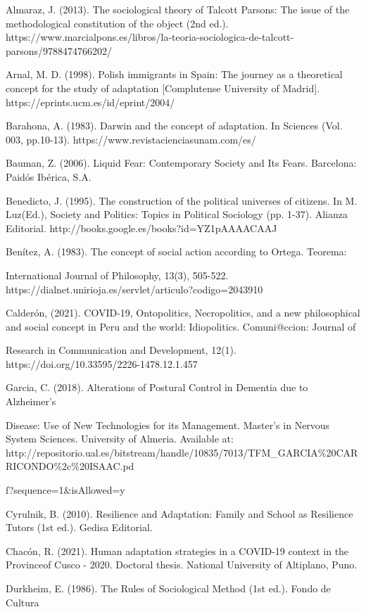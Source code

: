\documentclass{article}
\begin{document}
Almaraz, J. (2013). The sociological theory of Talcott Parsons: The issue of the methodological constitution of the object (2nd ed.). https://www.marcialpons.es/libros/la-teoria-sociologica-de-talcott-parsons/9788474766202/

Arnal, M. D. (1998). Polish immigrants in Spain: The journey as a theoretical concept for the study of adaptation [Complutense University of Madrid]. https://eprints.ucm.es/id/eprint/2004/

Barahona, A. (1983). Darwin and the concept of adaptation. In Sciences (Vol. 003, pp.10-13). https://www.revistacienciasunam.com/es/

Bauman, Z. (2006). Liquid Fear: Contemporary Society and Its Fears. Barcelona: Paidós Ibérica, S.A.

Benedicto, J. (1995). The construction of the political universes of citizens. In M. Luz(Ed.), Society and Politics: Topics in Political Sociology (pp. 1-37). Alianza Editorial. http://books.google.es/books?id=YZ1pAAAACAAJ

Benítez, A. (1983). The concept of social action according to Ortega. Teorema:

International Journal of Philosophy, 13(3), 505-522. https://dialnet.unirioja.es/servlet/articulo?codigo=2043910

Calderón, (2021). COVID-19, Ontopolitics, Necropolitics, and a new philosophical and social concept in Peru and the world: Idiopolitics. Comuni@ccion: Journal of

Research in Communication and Development, 12(1). https://doi.org/10.33595/2226-1478.12.1.457

Garcia, C. (2018). Alterations of Postural Control in Dementia due to Alzheimer's

Disease: Use of New Technologies for its Management. Master's in Nervous System Sciences. University of Almeria. Available at: http://repositorio.ual.es/bitstream/handle/10835/7013/TFM\_GARCIA\%20CARRICONDO\%2c\%20ISAAC.pd

f?sequence=1\&isAllowed=y

Cyrulnik, B. (2010). Resilience and Adaptation: Family and School as Resilience Tutors (1st ed.). Gedisa Editorial.

Chacón, R. (2021). Human adaptation strategies in a COVID-19 context in the Provinceof Cusco - 2020. Doctoral thesis. National University of Altiplano, Puno.

Durkheim, E. (1986). The Rules of Sociological Method (1st ed.). Fondo de Cultura
\end{document}
